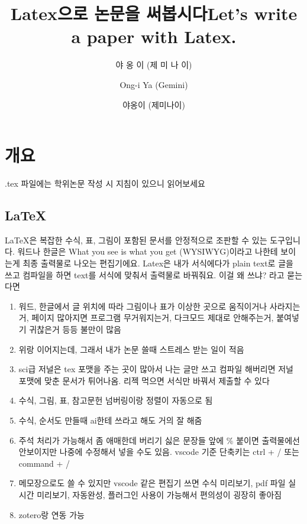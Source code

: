 \documentclass[doctor, korean]{pnuthesis_me}
\title[korean]{Latex으로 논문을 써봅시다}
\title[english]{Let's write a paper with Latex.}
\author[korean]{야 옹 이 (제 미 나 이)}
\author[english]{Ong-i Ya (Gemini)}
\author[nospace]{야옹이 (제미나이)}
\begin{document}
\renewcommand{\baselinestretch}{1.5}    %
\selectfont                             %

\changepage{5mm}{}{}{}{}{}{}{}{-5mm}    %


\makelists

\chapter{개요}
.tex 파일에는 학위논문 작성 시 지침이 있으니 읽어보세요

\section{\LaTeX}
\LaTeX 은 복잡한 수식, 표, 그림이 포함된 문서를 안정적으로 조판할 수 있는 도구입니다.
워드나 한글은 What you see is what you get (WYSIWYG)이라고 나한테 보이는게 최종 출력물로 나오는 편집기에요.
Latex은 내가 서식에다가 plain text로 글을 쓰고 컴파일을 하면 text를 서식에 맞춰서 출력물로 바꿔줘요.
이걸 왜 쓰냐? 라고 묻는다면
\begin{enumerate}
    \item 워드, 한글에서 글 위치에 따라 그림이나 표가 이상한 곳으로 움직이거나 사라지는거, 페이지 많아지면 프로그램 무거워지는거, 다크모드 제대로 안해주는거, 붙여넣기 귀찮은거 등등 불만이 많음
    \item 위랑 이어지는데, 그래서 내가 논문 쓸때 스트레스 받는 일이 적음
    \item sci급 저널은 tex 포맷을 주는 곳이 많아서 나는 글만 쓰고 컴파일 해버리면 저널 포맷에 맞춘 문서가 튀어나옴. 리젝 먹으면 서식만 바꿔서 제출할 수 있다
    \item 수식, 그림, 표, 참고문헌 넘버링이랑 정렬이 자동으로 됨
    \item 수식, 순서도 만들때 ai한테 쓰라고 해도 거의 잘 해줌
    \item 주석 처리가 가능해서 좀 애매한데 버리기 싫은 문장들 앞에 \%{} 붙이면 출력물에선 안보이지만 나중에 수정해서 넣을 수도 있음. vscode 기준 단축키는 ctrl + / 또는 command + /
    \item 메모장으로도 쓸 수 있지만 vscode 같은 편집기 쓰면 수식 미리보기, pdf 파일 실시간 미리보기, 자동완성, 플러그인 사용이 가능해서 편의성이 굉장히 좋아짐
    \item zotero랑 연동 가능
\end{enumerate}
\end{document}
